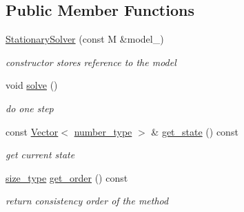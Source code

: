 \subsection*{Public Member Functions}
\begin{DoxyCompactItemize}
\item 
\hypertarget{classhdnum_1_1StationarySolver_a4282c63a68f76418efa5a924c34bcfc1}{
\hyperlink{classhdnum_1_1StationarySolver_a4282c63a68f76418efa5a924c34bcfc1}{StationarySolver} (const M \&model\_\-)}
\label{classhdnum_1_1StationarySolver_a4282c63a68f76418efa5a924c34bcfc1}

\begin{DoxyCompactList}\small\item\em constructor stores reference to the model \item\end{DoxyCompactList}\item 
\hypertarget{classhdnum_1_1StationarySolver_a7efb580302c52ed737346f05536b94c6}{
void \hyperlink{classhdnum_1_1StationarySolver_a7efb580302c52ed737346f05536b94c6}{solve} ()}
\label{classhdnum_1_1StationarySolver_a7efb580302c52ed737346f05536b94c6}

\begin{DoxyCompactList}\small\item\em do one step \item\end{DoxyCompactList}\item 
\hypertarget{classhdnum_1_1StationarySolver_a057916fb88d97f739ecdd00e5237297c}{
const \hyperlink{classhdnum_1_1Vector}{Vector}$<$ \hyperlink{classhdnum_1_1StationarySolver_a48abc9e5fb531e68c63e5c72bdbb28a6}{number\_\-type} $>$ \& \hyperlink{classhdnum_1_1StationarySolver_a057916fb88d97f739ecdd00e5237297c}{get\_\-state} () const }
\label{classhdnum_1_1StationarySolver_a057916fb88d97f739ecdd00e5237297c}

\begin{DoxyCompactList}\small\item\em get current state \item\end{DoxyCompactList}\item 
\hypertarget{classhdnum_1_1StationarySolver_a33ef43557b544c275e2240f155a33e6f}{
\hyperlink{classhdnum_1_1StationarySolver_a95c041e1f3af75fd035bd94cb58184d8}{size\_\-type} \hyperlink{classhdnum_1_1StationarySolver_a33ef43557b544c275e2240f155a33e6f}{get\_\-order} () const }
\label{classhdnum_1_1StationarySolver_a33ef43557b544c275e2240f155a33e6f}

\begin{DoxyCompactList}\small\item\em return consistency order of the method \item\end{DoxyCompactList}\end{DoxyCompactItemize}



